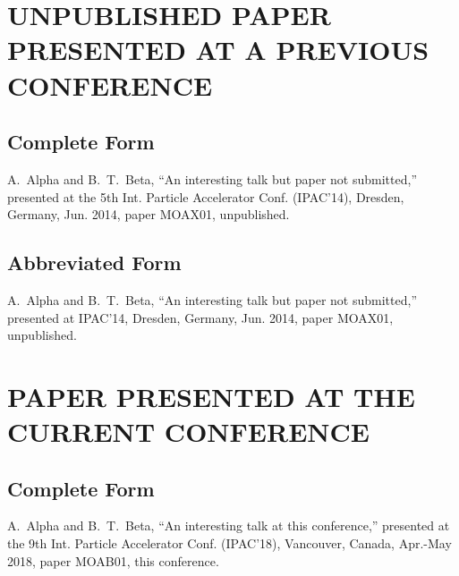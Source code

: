\section{UNPUBLISHED PAPER PRESENTED AT A PREVIOUS CONFERENCE}


\subsection{Complete Form}

\begin{thebibliography}{9} %
\setcounter{enumi}{3}
	A.~Alpha and B.~T.~Beta,
	“An interesting talk but paper not submitted,”
	presented at the 5th Int. Particle Accelerator Conf. (IPAC’14),
	Dresden, Germany, Jun. 2014, paper MOAX01, unpublished.
\end{thebibliography}

\subsection{Abbreviated Form}

\begin{thebibliography}{9} %
\setcounter{enumi}{3}
	A.~Alpha and B.~T.~Beta,
	“An interesting talk but paper not submitted,”
	presented at IPAC’14,
	Dresden, Germany, Jun. 2014, paper MOAX01, unpublished.
\end{thebibliography}


\section{PAPER PRESENTED AT THE CURRENT CONFERENCE}

\subsection{Complete Form}

\begin{thebibliography}{9} %
\setcounter{enumi}{4}
	A.~Alpha and B.~T.~Beta,
	“An interesting talk at this conference,”
	presented at the 9th Int. Particle Accelerator
	Conf. (IPAC’18), Vancouver, Canada, Apr.-May 2018, 
	paper MOAB01, this conference.
\end{thebibliography}

